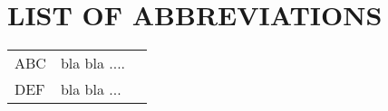\section*{LIST OF ABBREVIATIONS}
 {}

\begin{tabularx}{\textwidth}{ L{0.4} L{1.3} L{1.3} }
    ABC & bla bla .... \\
    DEF & bla bla ... \\
    \end{tabularx}

\newpage